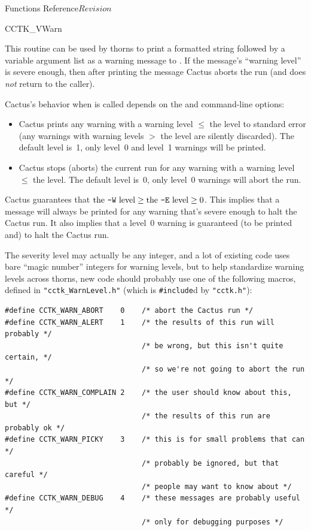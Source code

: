 \begin{cactuspart}{ Functions Reference}{}{$Revision$}
\begin{FunctionDescription}{CCTK\_VWarn}
\begin{Discussion}
This routine can be used by thorns to print a formatted string followed
by a variable argument list as a warning message to .  If
the message's ``warning level'' is severe enough, then after printing
the message Cactus aborts the run (and  does {\em not\/}
return to the caller).

Cactus's behavior when  is called depends on the
 and  command-line options:
\begin{itemize}
\item   Cactus prints any warning with a warning level $\le$
        the  level to standard error (any warnings with
        warning levels $>$ the  level are silently discarded).
        The default  level is~1, \ie{} only level~0 and level~1
        warnings will be printed.
\item   Cactus stops (aborts) the current run for any warning
        with a warning level $\le$ the  level.
        The default  level is~0, \ie{} only level~0
        warnings will abort the run.
\end{itemize}

Cactus guarantees that
$\mbox{the \mbox{\texttt{-W}}~level} \ge \mbox{the \mbox{\texttt{-E}}~level} \ge 0$.
This implies that a message will always be printed for any warning that's
severe enough to halt the Cactus run.  It also implies that a level~0
warning is guaranteed (to be printed and) to halt the Cactus run.

The severity level may actually be any integer, and a lot of existing
code uses bare ``magic number'' integers for warning levels, but to
help standardize warning levels across thorns, new code should probably
use one of the following macros, defined in \verb|"cctk_WarnLevel.h"|
(which is \verb|#include|d by \verb|"cctk.h"|):
\begin{verbatim}
#define CCTK_WARN_ABORT    0    /* abort the Cactus run */
#define CCTK_WARN_ALERT    1    /* the results of this run will probably */
                                /* be wrong, but this isn't quite certain, */
                                /* so we're not going to abort the run */
#define CCTK_WARN_COMPLAIN 2    /* the user should know about this, but */
                                /* the results of this run are probably ok */
#define CCTK_WARN_PICKY    3    /* this is for small problems that can */
                                /* probably be ignored, but that careful */
                                /* people may want to know about */
#define CCTK_WARN_DEBUG    4    /* these messages are probably useful */
                                /* only for debugging purposes */
\end{verbatim}


\end{Discussion}
\end{FunctionDescription}
\end{cactuspart}
